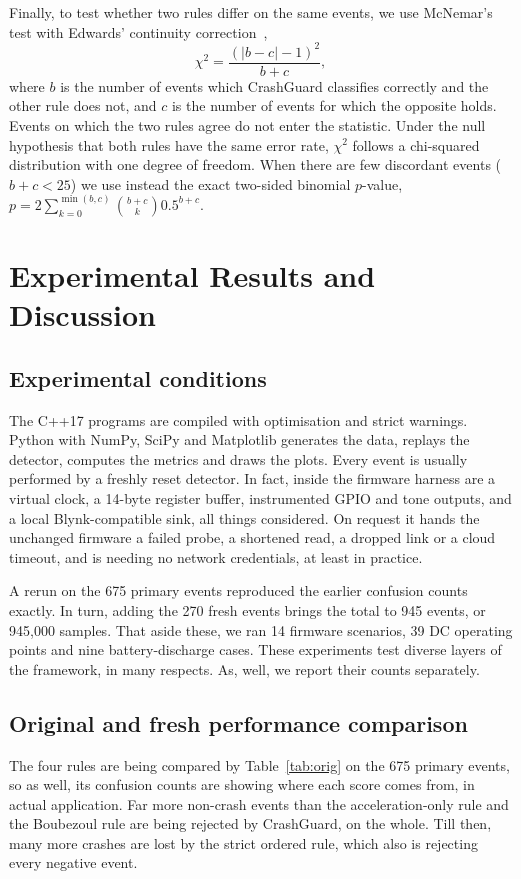 \documentclass[10pt,a4paper]{article}
\begin{document}
Finally, to test whether two rules differ on the same events, we use McNemar's test with Edwards' continuity correction~\cite{mcnemar1947},
\begin{equation}\label{eq:mcnemar}
\chi^2 = \frac{(|b - c| - 1)^2}{b + c},
\end{equation}
where $b$ is the number of events which CrashGuard classifies correctly and the other rule does not, and $c$ is the number of events for which the opposite holds. Events on which the two rules agree do not enter the statistic. Under the null hypothesis that both rules have the same error rate, $\chi^2$ follows a chi-squared distribution with one degree of freedom. When there are few discordant events ($b+c<25$) we use instead the exact two-sided binomial $p$-value, $p = 2 \sum_{k=0}^{\min(b,c)} \binom{b+c}{k} 0.5^{b+c}$.

\section{Experimental Results and Discussion}
\subsection{Experimental conditions}
The C++17 programs are compiled with optimisation and strict warnings. Python with NumPy, SciPy and Matplotlib generates the data, replays the detector, computes the metrics and draws the plots. Every event is usually performed by a freshly reset detector. In fact, inside the firmware harness are a virtual clock, a 14-byte register buffer, instrumented GPIO and tone outputs, and a local Blynk-compatible sink, all things considered. On request it hands the unchanged firmware a failed probe, a shortened read, a dropped link or a cloud timeout, and is needing no network credentials, at least in practice.

A rerun on the 675 primary events reproduced the earlier confusion counts exactly. In turn, adding the 270 fresh events brings the total to 945 events, or 945,000 samples. That aside these, we ran 14 firmware scenarios, 39 DC operating points and nine battery-discharge cases. These experiments test diverse layers of the framework, in many respects. As, well, we report their counts separately.

\subsection{Original and fresh performance comparison}
The four rules are being compared by Table~\ref{tab:orig} on the 675 primary events, so as well, its confusion counts are showing where each score comes from, in actual application. Far more non-crash events than the acceleration-only rule and the Boubezoul rule are being rejected by CrashGuard, on the whole. Till then, many more crashes are lost by the strict ordered rule, which also is rejecting every negative event.
\end{document}
